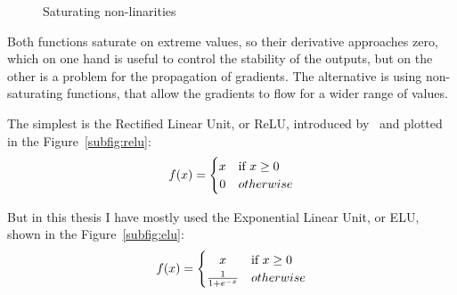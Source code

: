 \begin{figure}[tb]
	\hfil
	\caption{Saturating non-linarities}\label{fig:non_linear}
\end{figure}

Both functions saturate on extreme values, 
so their derivative approaches zero, which on one hand is useful to control the stability of the outputs, but on the other is a problem for the propagation of gradients.
The alternative is using non-saturating functions, that allow the gradients to flow for a wider range of values.

The simplest is the Rectified Linear Unit, or ReLU, introduced by~\citet{relu} and plotted in the Figure~\ref{subfig:relu}:
\begin{equation*}
f(x) =  \begin{cases}
\hfil x &  \text{if } x \geq 0 \\
\hfil 0 & otherwise
\end{cases}
\end{equation*}

But in this thesis I have mostly used the Exponential Linear Unit, or ELU, shown in the Figure~\ref{subfig:elu}:
\begin{equation*}
f(x) =  \begin{cases}
\hfil x &  \text{if } x \geq 0 \\
\frac{1}{1 + e^{-x}} & otherwise
\end{cases}
\end{equation*}


